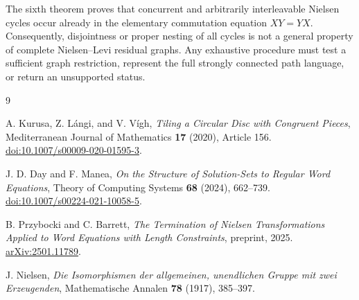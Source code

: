 \documentclass[11pt]{article}
\begin{document}
The sixth theorem proves that concurrent and arbitrarily interleavable Nielsen cycles occur already in the elementary commutation equation $XY=YX$. Consequently, disjointness or proper nesting of all cycles is not a general property of complete Nielsen--Levi residual graphs. Any exhaustive procedure must test a sufficient graph restriction, represent the full strongly connected path language, or return an unsupported status.

\begin{thebibliography}{9}

A. Kurusa, Z. L\'angi, and V. V\'igh,
\emph{Tiling a Circular Disc with Congruent Pieces},
Mediterranean Journal of Mathematics \textbf{17} (2020), Article 156.
\href{https://doi.org/10.1007/s00009-020-01595-3}{doi:10.1007/s00009-020-01595-3}.

J. D. Day and F. Manea,
\emph{On the Structure of Solution-Sets to Regular Word Equations},
Theory of Computing Systems \textbf{68} (2024), 662--739.
\href{https://doi.org/10.1007/s00224-021-10058-5}{doi:10.1007/s00224-021-10058-5}.

B. Przybocki and C. Barrett,
\emph{The Termination of Nielsen Transformations Applied to Word Equations with Length Constraints},
preprint, 2025.
\href{https://arxiv.org/abs/2501.11789}{arXiv:2501.11789}.

J. Nielsen,
\emph{Die Isomorphismen der allgemeinen, unendlichen Gruppe mit zwei Erzeugenden},
Mathematische Annalen \textbf{78} (1917), 385--397.

\end{thebibliography}
\end{document}
